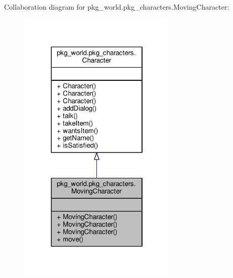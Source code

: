 Collaboration diagram for pkg\-\_\-world.\-pkg\-\_\-characters.\-Moving\-Character\-:\nopagebreak
\begin{figure}[H]
\begin{center}
\leavevmode
\includegraphics[width=214pt]{classpkg__world_1_1pkg__characters_1_1MovingCharacter__coll__graph}
\end{center}
\end{figure}
